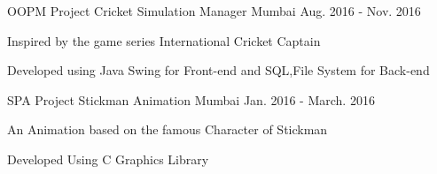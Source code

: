 \begin{cventries}
  \cventry
    {OOPM Project} %
    {Cricket Simulation Manager} %
    {Mumbai} %
    {Aug. 2016 - Nov. 2016} %
    {
      \begin{cvitems} %
        \item {Inspired by the game series International Cricket Captain}
	\item {Developed using Java Swing for Front-end and SQL,File System for Back-end}
      \end{cvitems}
    }

  \cventry
    {SPA Project} %
    {Stickman Animation} %
    {Mumbai} %
    {Jan. 2016 - March. 2016} %
    {
      \begin{cvitems} %
        \item {An Animation based on the famous Character of Stickman}
	\item {Developed Using C Graphics Library}
      \end{cvitems}
    }

    
\end{cventries}
